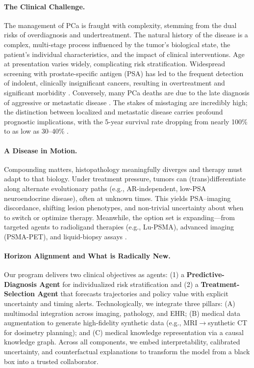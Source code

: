 \documentclass[11pt, a4paper]{article}
\begin{document}
\paragraph{The Clinical Challenge.} The management of PCa is fraught with complexity, stemming from the dual risks of overdiagnosis and undertreatment. The natural history of the disease is a complex, multi-stage process influenced by the tumor’s biological state, the patient’s individual characteristics, and the impact of clinical interventions. Age at presentation varies widely, complicating risk stratification. Widespread screening with prostate-specific antigen (PSA) has led to the frequent detection of indolent, clinically insignificant cancers, resulting in overtreatment and significant morbidity \cite{PadhaniSchoots2023,JenaTaneja2018,CaraccioloCastello2022}. Conversely, many PCa deaths are due to the late diagnosis of aggressive or metastatic disease \cite{PadhaniSchoots2023}. The stakes of misstaging are incredibly high; the distinction between localized and metastatic disease carries profound prognostic implications, with the 5-year survival rate dropping from nearly 100\% to as low as 30–40\% \cite{WangODwyer2024,CereserEvangelista2023}.

\paragraph{A Disease in Motion.} Compounding matters, histopathology meaningfully diverges and therapy must adapt to that biology. Under treatment pressure, tumors can (trans)differentiate along alternate evolutionary paths (e.g., AR-independent, low-PSA neuroendocrine disease), often at unknown times. This yields PSA–imaging discordance, shifting lesion phenotypes, and non-trivial uncertainty about when to switch or optimize therapy. Meanwhile, the option set is expanding—from targeted agents to radioligand therapies (e.g., Lu-PSMA), advanced imaging (PSMA-PET), and liquid-biopsy assays .

\paragraph{Horizon Alignment and What is Radically New.} Our program delivers two clinical objectives as agents: (1) a \textbf{Predictive-Diagnosis Agent} for individualized risk stratification and (2) a \textbf{Treatment-Selection Agent} that forecasts trajectories and policy value with explicit uncertainty and timing alerts. Technologically, we integrate three pillars: (A) multimodal integration across imaging, pathology, and EHR; (B) medical data augmentation to generate high-fidelity synthetic data (e.g., MRI$\rightarrow$synthetic CT for dosimetry planning); and (C) medical knowledge representation via a causal knowledge graph. Across all components, we embed interpretability, calibrated uncertainty, and counterfactual explanations to transform the model from a black box into a trusted collaborator.
\end{document}
